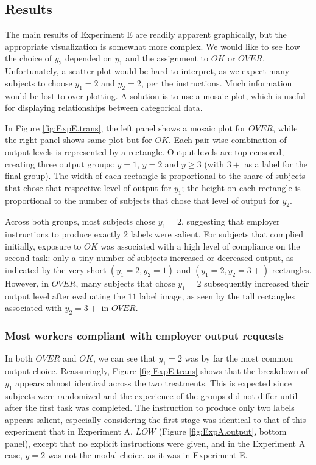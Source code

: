 \documentclass[12pt]{article}
\begin{document}
\subsection{Results}
The main results of Experiment E are readily apparent graphically, but
the appropriate visualization is somewhat more complex. We would like
to see how the choice of $y_2$ depended on $y_1$ and the assignment to
$OK$ or $OVER$. Unfortunately, a scatter plot would be hard to
interpret, as we expect many subjects to choose $y_1=2$ and $y_2=2$,
per the instructions.  Much information would be lost to
over-plotting. A solution is to use a mosaic plot, which is useful for
displaying relationships between categorical data.

In Figure \ref{fig:ExpE.trans}, the left panel shows a mosaic plot for
$OVER$, while the right panel shows same plot but for $OK$. Each
pair-wise combination of output levels is represented by a rectangle.
Output levels are top-censored, creating three output groups: $y=1$,
$y=2$ and $y \ge 3$ (with $3+$ as a label for the final group).  The
width of each rectangle is proportional to the share of subjects that
chose that respective level of output for $y_1$; the height on each
rectangle is proportional to the number of subjects that chose that
level of output for $y_2$.

Across both groups, most subjects chose $y_1=2$, suggesting that employer
instructions to produce exactly 2 labels were salient. For subjects that
complied initially, exposure to $OK$ was associated with a high level of
compliance on the second task: only a tiny number of subjects
increased or decreased output, as indicated by the very short
$(y_1=2,y_2=1)$ and $(y_1=2,y_2=3+)$ rectangles. However, in $OVER$,
many subjects that chose $y_1=2$ subsequently increased their output
level after evaluating the $11$ label image, as seen by the tall
rectangles associated with $y_2 = 3+$ in $OVER$.

\subsubsection{Most workers compliant with employer output requests} 
In both $OVER$ and $OK$, we can see that $y_1=2$ was by far the most
common output choice. Reassuringly, Figure \ref{fig:ExpE.trans} shows
that the breakdown of $y_1$ appears almost identical across the two
treatments. This is expected since subjects were randomized and the
experience of the groups did not differ until after the first task was
completed. The instruction to produce only two labels appears salient,
especially considering the first stage was identical to that of this
experiment that in Experiment A, $LOW$ (Figure \ref{fig:ExpA.output},
bottom panel), except that no explicit instructions were given, and in
the Experiment A case, $y=2$ was not the modal choice, as it was in
Experiment E.
\end{document}
